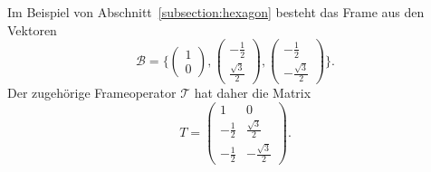 \begin{beispiel}
Im Beispiel von Abschnitt~\ref{subsection:hexagon} besteht das Frame
aus den Vektoren
\[
\mathcal{B}
=
\biggl\{
\begin{pmatrix}1\\[2pt] 0\end{pmatrix},
\begin{pmatrix}-\frac12\\[2pt] \frac{\sqrt{3}}2\end{pmatrix},
\begin{pmatrix}-\frac12\\[2pt] -\frac{\sqrt{3}}2\end{pmatrix}
\biggr\}.
\]
Der zugehörige Frameoperator $\mathcal{T}$ hat daher die Matrix
\begin{equation}
T
=
\begin{pmatrix}
1&0\\[2pt]
-\frac12&\frac{\sqrt{3}}2\\[2pt]
-\frac12&-\frac{\sqrt{3}}2
\end{pmatrix}.
\label{beispielTmatrix}
\end{equation}
\end{beispiel}

